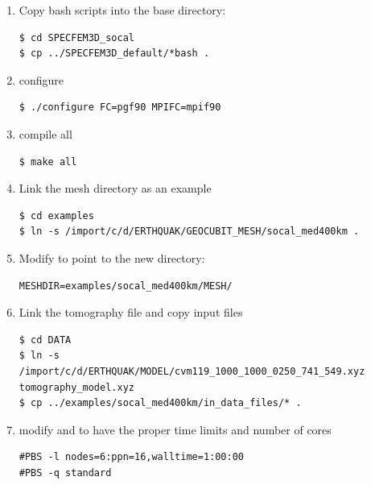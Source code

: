 \documentclass[10pt,fleqn,letterpaper]{article}
\begin{document}
\begin{enumerate}
\item Copy bash scripts into the base directory:

\begin{lstlisting}
$ cd SPECFEM3D_socal
$ cp ../SPECFEM3D_default/*bash .
\end{lstlisting}

\item configure
\begin{lstlisting}
$ ./configure FC=pgf90 MPIFC=mpif90
\end{lstlisting}

\item compile all
\begin{lstlisting}
$ make all
\end{lstlisting}

\item Link the mesh directory as an example
\begin{lstlisting}
$ cd examples
$ ln -s /import/c/d/ERTHQUAK/GEOCUBIT_MESH/socal_med400km .
\end{lstlisting}

\item Modify  to point to the new directory:
\begin{lstlisting}
MESHDIR=examples/socal_med400km/MESH/
\end{lstlisting}

\item Link the tomography file and copy input files
\begin{lstlisting}
$ cd DATA
$ ln -s /import/c/d/ERTHQUAK/MODEL/cvm119_1000_1000_0250_741_549.xyz tomography_model.xyz
$ cp ../examples/socal_med400km/in_data_files/* .
\end{lstlisting}

\item modify  and  to have the proper time limits and number of cores
\begin{lstlisting}
#PBS -l nodes=6:ppn=16,walltime=1:00:00
#PBS -q standard
\end{lstlisting}

%
%


\end{enumerate}
\end{document}
